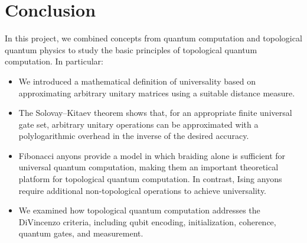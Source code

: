 \documentclass[11pt]{article}
\begin{document}
	
	\section{Conclusion}
	
	In this project, we combined concepts from quantum computation and topological quantum physics to study the basic principles of topological quantum computation. In particular:
	
	\begin{itemize}
		\item[$\bullet$] We introduced a mathematical definition of universality based on approximating arbitrary unitary matrices using a suitable distance measure.
		
		\item[$\bullet$] The Solovay--Kitaev theorem shows that, for an appropriate finite universal gate set, arbitrary unitary operations can be approximated with a polylogarithmic overhead in the inverse of the desired accuracy.
		
		\item[$\bullet$] Fibonacci anyons provide a model in which braiding alone is sufficient for universal quantum computation, making them an important theoretical platform for topological quantum computation. In contrast, Ising anyons require additional non-topological operations to achieve universality.
		
		\item[$\bullet$] We examined how topological quantum computation addresses the DiVincenzo criteria, including qubit encoding, initialization, coherence, quantum gates, and measurement.
	\end{itemize}
	
\end{document}
